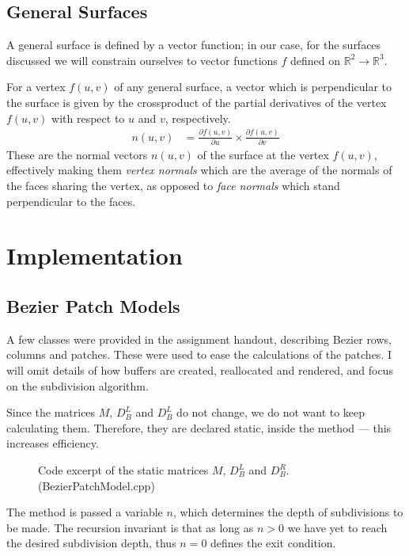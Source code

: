 \documentclass[11pt]{article}
\newcommand{\imp}{\rightarrow}
\newcommand{\codefig}[5]
{
\begin{figure}[H]
    
    \caption{Code excerpt #5 (#2)}
    \label{code:#1}
\end{figure}
}
\begin{document}
\subsection{General Surfaces}
\label{sec:theory|sub:general-surfaces}
A general surface is defined by a vector function; in our case, for the
surfaces discussed we will constrain ourselves to vector functions $f$ defined
on $\mathbb{R}^2 \imp \mathbb{R}^3$.

For a vertex $f(u,v)$ of any general surface, a vector which is perpendicular
to the surface is given by the crossproduct of the partial derivatives of the
vertex $f(u,v)$ with respect to $u$ and $v$, respectively.
\begin{align}
    n(u,v) &= \frac{\partial f(u,v)}{\partial u}
              \times
              \frac{\partial f(u,v)}{\partial v} 
\end{align}
These are the normal vectors $n(u,v)$ of the surface at the vertex $f(u,v)$,
effectively making them {\it vertex normals} which are the average of the
normals of the faces sharing the vertex, as opposed to {\it face normals}
which stand perpendicular to the faces.

\newpage
\section{Implementation}

\subsection{Bezier Patch Models}
A few classes were provided in the assignment handout, describing Bezier rows,
columns and patches. These were used to ease the calculations of the patches.
I will omit details of how buffers are created, reallocated and rendered, and
focus on the subdivision algorithm.

Since the matrices $M$, $D_B^L$ and $D_B^L$ do not change, we do not want to
keep calculating them. Therefore, they are declared static, inside the method
--- this increases efficiency.

\codefig{bezier-patch-subd|part:0}{BezierPatchModel.cpp}{78}{93}
{of the static matrices $M$, $D_B^L$ and $D_B^R$.}

The method is passed a variable $n$, which determines the depth of
subdivisions to be made. The recursion invariant is that as long as $n > 0$ we
have yet to reach the desired subdivision depth, thus $n = 0$ defines the exit
condition.
\end{document}
